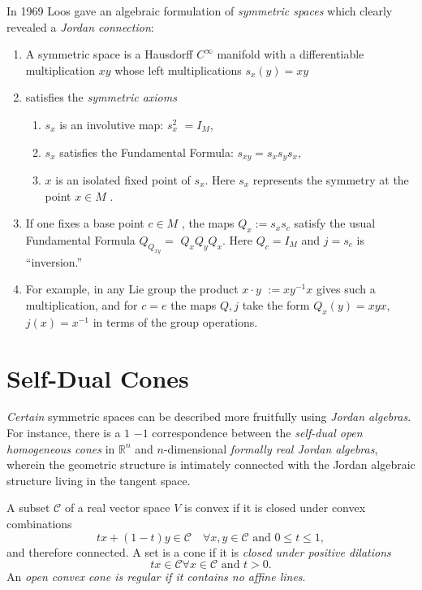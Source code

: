 \documentclass[aps,preprint]{revtex4}%
\begin{document}
In 1969 Loos gave an algebraic formulation of \emph{symmetric spaces} which
clearly revealed a \emph{Jordan connection}: 

\begin{enumerate}
\item A symmetric space is a Hausdorff $C^{\infty}$ manifold with a
differentiable multiplication $x$\textperiodcentered$y$ whose left
multiplications $s_{x}(y)=x$\textperiodcentered$y$ 

\item satisfies the \emph{symmetric axioms} 

\begin{enumerate}
\item $s_{x}$ is an involutive map: $s_{x}^{2}$ $=I_{M}$, 

\item $s_{x}$ satisfies the Fundamental Formula: $s_{xy}=s_{x}s_{y}s_{x},$

\item $x$ is an isolated fixed point of $s_{x}$. Here $s_{x}$ represents the
symmetry at the point $x\in M$ . 
\end{enumerate}

\item If one fixes a base point $c\in M$ , the maps $Q_{x}:=s_{x}s_{c}$
satisfy the usual Fundamental Formula $Q_{Q_{xy}}=$ $Q_{x}Q_{y}Q_{x}$. Here
$Q_{c}=I_{M}$ and $j=s_{c}$ is \textquotedblleft inversion.\textquotedblright\ 

\item For example, in any Lie group the product $x\cdot y$ $:=xy^{-1}x$ gives
such a multiplication, and for $c=e$ the maps $Q,j$ take the form
$Q_{x}(y)=xyx,$ $j(x)=x^{-1}$ in terms of the group operations.
\end{enumerate}

\section{Self-Dual Cones}

\emph{Certain }symmetric spaces can be described more fruitfully using
\emph{Jordan algebras}. For instance, there is a $1$ $-1$ correspondence
between the \emph{self-dual open homogeneous cones} in $\mathbb{R}^{n}$ and
$n$-dimensional \emph{formally real Jordan algebras}, wherein the geometric
structure is intimately connected with the Jordan algebraic structure living
in the tangent space.

A subset $\mathcal{C}$ of a real vector space $V$ is convex if it is closed
under convex combinations
\begin{equation}
tx+(1-t)y\in\mathcal{C\quad}\forall x,y\in\mathcal{C}\text{ and }0\leq t\leq1,
\end{equation}
and therefore connected. A set is a cone if it is \emph{closed under positive
dilations}%
\begin{equation}
tx\in\mathcal{C}\forall x\in\mathcal{C}\text{ and }t>0.
\end{equation}
An \emph{open convex cone is regular if it contains no affine lines}.
\end{document}
